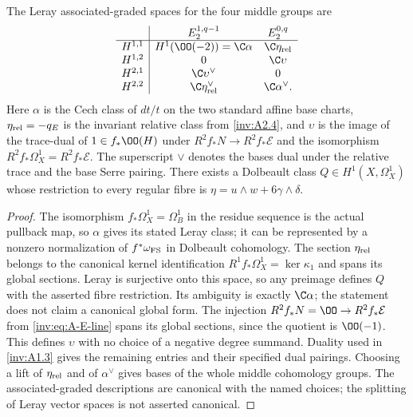 \begin{proposition}\label{inv:A3.2}\label{wb:lem:bcpr-eta-extension}
The Leray associated-graded spaces for the four middle groups are
\[
\begin{array}{c|cc}
&E_2^{1,q-1}&E_2^{0,q}\\\hline
H^{1,1}&H^1(\OO(-2))=\C\alpha&\C\eta_{\rm rel}\\
H^{1,2}&0&\C\upsilon\\
H^{2,1}&\C\upsilon^\vee&0\\
H^{2,2}&\C\eta_{\rm rel}^\vee&\C\alpha^\vee.
\end{array}
\]
Here $\alpha$ is the Cech class of $dt/t$ on the two standard affine
base charts, $\eta_{\rm rel}=-q_E$ is the invariant relative class
from \ref{inv:A2.4}, and $\upsilon$ is the image of the trace-dual of
$1\in f_*\OO(H)$ under $R^2f_*N\to R^2f_*\mathcal E$ and the
isomorphism $R^2f_*\Omega_X^1=R^2f_*\mathcal E$.
The superscript $\vee$ denotes the bases dual under the relative
trace and the base Serre pairing.  There exists a Dolbeault class
$Q\in H^1(X,\Omega_X^1)$ whose restriction to every regular fibre
is $\eta=u\wedge w+6\gamma\wedge\delta$.
\end{proposition}

\begin{proof}
The isomorphism $f_*\Omega_X^1=\Omega_B^1$ in the residue sequence
is the actual pullback map, so $\alpha$ gives its stated Leray
class; it can be represented by a nonzero normalization of
$f^*\omega_{\rm FS}$ in Dolbeault cohomology.  The section
$\eta_{\rm rel}$ belongs to the canonical kernel identification
$R^1f_*\Omega_X^1=\ker\kappa_1$ and spans its global sections.
Leray is surjective onto this space, so any preimage defines $Q$
with the asserted fibre restriction.  Its ambiguity is exactly
$\C\alpha$; the statement does not claim a canonical global form.
The injection $R^2f_*N=\OO\to R^2f_*\mathcal E$ from
\eqref{inv:eq:A-E-line} spans its global sections, since the quotient
is $\OO(-1)$.  This defines $\upsilon$ with no choice of a negative
degree summand.  Duality used in \ref{inv:A1.3} gives the remaining entries
and their specified dual pairings.  Choosing a lift of
$\eta_{\rm rel}$ and of $\alpha^\vee$ gives bases of the whole
middle cohomology groups.  The associated-graded descriptions are
canonical with the named choices; the splitting of Leray vector
spaces is not asserted canonical.
\end{proof}

